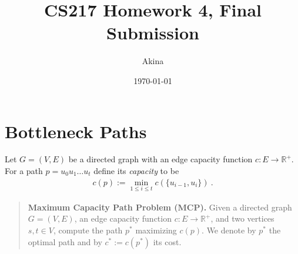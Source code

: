 \documentclass[11pt,a4paper,oneside]{article}
\newcommand{\R}{\mathbb{R}}
\renewcommand{\hwtitle} {CS217 Homework 4, Final Submission}
\renewcommand{\hwauthor}{Akina}
\renewcommand{\hwdate}{\today}
\begin{document}
\title{\hwtitle}
\author{\hwauthor}
\date{\hwdate}
\maketitle

\section*{Bottleneck Paths}

Let $G=(V,E)$ be a directed graph with an edge capacity function $c: E \rightarrow \R^+$. For a path
$p = u_0 u_1 \dots u_t$ define its {\em capacity} to be
\begin{align}
c(p) := \min_{1 \leq i \leq t} c( \{u_{i-1}, u_i\}) \ .
\end{align}

\begin{quotation}
	\textbf{Maximum Capacity Path Problem (MCP).} Given a directed graph $G = (V,E)$, an edge capacity function
	$c: E \rightarrow \R^+$, and two vertices $s, t \in V$, compute the path $p^*$ maximizing $c(p)$. We
	denote by $p^*$ the optimal path and by $c^* := c(p^*)$ its cost. 
\end{quotation}
\end{document}
